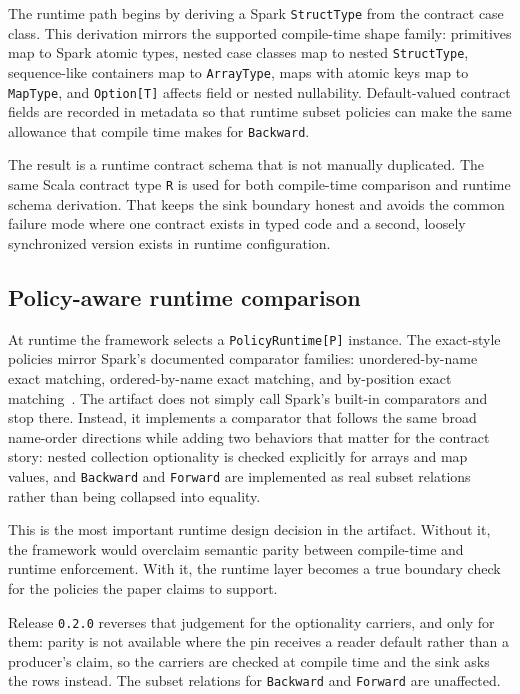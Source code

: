 The runtime path begins by deriving a Spark \texttt{StructType} from the contract case class. This derivation mirrors the supported compile-time shape family: primitives map to Spark atomic types, nested case classes map to nested \texttt{StructType}, sequence-like containers map to \texttt{ArrayType}, maps with atomic keys map to \texttt{MapType}, and \texttt{Option[T]} affects field or nested nullability. Default-valued contract fields are recorded in metadata so that runtime subset policies can make the same allowance that compile time makes for \texttt{Backward}.

The result is a runtime contract schema that is not manually duplicated. The same Scala contract type \texttt{R} is used for both compile-time comparison and runtime schema derivation. That keeps the sink boundary honest and avoids the common failure mode where one contract exists in typed code and a second, loosely synchronized version exists in runtime configuration.

\subsection{Policy-aware runtime comparison}

At runtime the framework selects a \texttt{PolicyRuntime[P]} instance. The exact-style policies mirror Spark's documented comparator families: unordered-by-name exact matching, ordered-by-name exact matching, and by-position exact matching~\cite{spark_datatype}. The artifact does not simply call Spark's built-in comparators and stop there. Instead, it implements a comparator that follows the same broad name-order directions while adding two behaviors that matter for the contract story: nested collection optionality is checked explicitly for arrays and map values, and \texttt{Backward} and \texttt{Forward} are implemented as real subset relations rather than being collapsed into equality.\carriermoved

This is the most important runtime design decision in the artifact. Without it, the framework would overclaim semantic parity between compile-time and runtime enforcement. With it, the runtime layer becomes a true boundary check for the policies the paper claims to support.

Release \texttt{0.2.0} reverses that judgement for the optionality carriers, and only for them: parity is not available where the pin receives a reader default rather than a producer's claim, so the carriers are checked at compile time and the sink asks the rows instead. The subset relations for \texttt{Backward} and \texttt{Forward} are unaffected.

